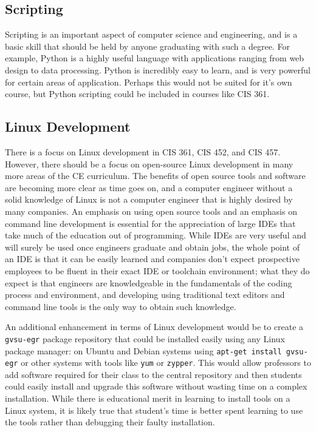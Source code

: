 \documentclass[12pt]{article}
\numberwithin{figure}{section}
\numberwithin{equation}{section}
\begin{document}
{\subsection{Scripting}\label{scripting}
Scripting is an important aspect of computer science and engineering,
and is a basic skill that should be held by anyone graduating with such
a degree. For example, Python is a highly useful language with
applications ranging from web design to data processing. Python is
incredibly easy to learn, and is very powerful for certain areas of
application. Perhaps this would not be suited for it's own course, but
Python scripting could be included in courses like CIS 361.

\subsection{Linux Development}\label{linux-development}
There is a focus on Linux development in CIS 361, CIS 452, and CIS 457.
However, there should be a focus on open-source Linux development in
many more areas of the CE curriculum. The benefits of open source tools
and software are becoming more clear as time goes on, and a computer
engineer without a solid knowledge of Linux is not a computer engineer
that is highly desired by many companies. An emphasis on using open
source tools and an emphasis on command line development is essential
for the appreciation of large IDEs that take much of the education out
of programming. While IDEs are very useful and will surely be used once
engineers graduate and obtain jobs, the whole point of an IDE is that it
can be easily learned and companies don't expect prospective employees
to be fluent in their exact IDE or toolchain environment; what they do
expect is that engineers are knowledgeable in the fundamentals of the
coding process and environment, and developing using traditional text
editors and command line tools is the only way to obtain such knowledge.

\bigskip

An additional enhancement in terms of Linux development would be to
create a \texttt{gvsu-egr} package repository that could be installed
easily using any Linux package manager: on Ubuntu and Debian systems
using \texttt{apt-get install gvsu-egr} or other systems with tools like
\texttt{yum} or \texttt{zypper}. This would allow professors to add
software required for their class to the central repository and then
students could easily install and upgrade this software without wasting
time on a complex installation. While there is educational merit in
learning to install tools on a Linux system, it is likely true that
student's time is better spent learning to use the tools rather than
debugging their faulty installation.

}
\end{document}
